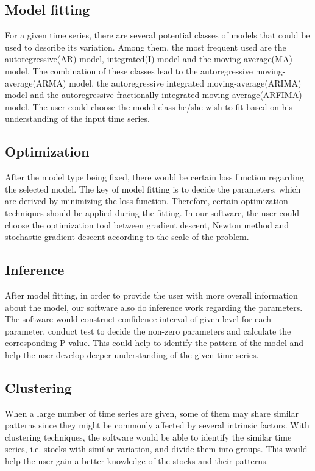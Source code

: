 

\subsection{Model fitting}

For a given time series, there are several potential classes of models that could be used to describe its variation. Among them, the most frequent used are the autoregressive(AR) model, integrated(I) model and the moving-average(MA) model. The combination of these classes lead to the autoregressive moving-average(ARMA) model, the autoregressive integrated moving-average(ARIMA) model and the autoregressive fractionally integrated moving-average(ARFIMA) model. The user could choose the model class he/she wish to fit based on his understanding of the input time series.

\subsection{Optimization}
After the model type being fixed, there would be certain loss function regarding the selected model. The key of model fitting is to decide the parameters, which are derived by minimizing the loss function. Therefore, certain optimization techniques should be applied during the fitting. In our software, the user could choose the optimization tool between gradient descent, Newton method and stochastic gradient descent according to the scale of the problem.

\subsection{Inference}
After model fitting, in order to provide the user with more overall information about the model, our software also do inference work regarding the parameters. The software would construct confidence interval of given level for each parameter, conduct test to decide the non-zero parameters and calculate the corresponding P-value. This could help to identify the pattern of the model and help the user develop deeper understanding of the given time series. 

\subsection{Clustering}

When a large number of time series are given, some of them may share similar patterns since they might be commonly affected by several intrinsic factors. With clustering techniques, the software would be able to identify the similar time series, i.e. stocks with similar variation, and divide them into groups. This would help the user gain a better knowledge of the stocks and their patterns.


